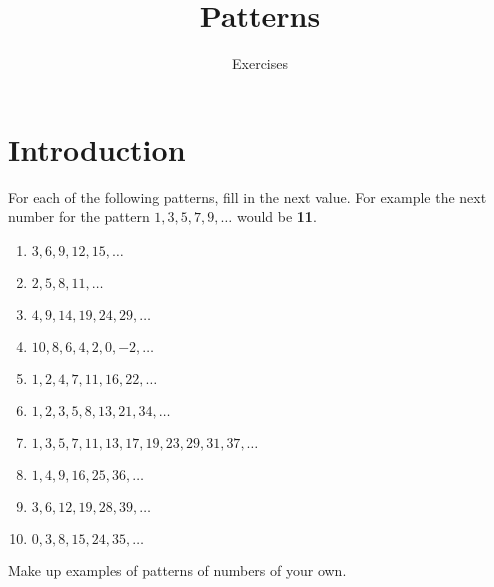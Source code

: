 \documentclass[11pt]{article}
\title{Patterns}
\author{Exercises}
\begin{document}
\maketitle
\section*{Introduction}
For each of the following patterns, fill in the next value.  For example the next number for the pattern
$1, 3, 5, 7, 9, \ldots$
would be \textbf{11}.
\begin{enumerate}
	\item $3, 6, 9, 12, 15, \ldots$
	\item $2, 5, 8, 11, \ldots$
	\item $4, 9, 14, 19, 24, 29, \ldots$
	\item $10, 8, 6, 4, 2, 0, -2, \ldots$
	\item $1, 2, 4, 7, 11, 16, 22, \ldots$
	\item $1, 2, 3, 5, 8, 13, 21, 34, \ldots$
	\item $1, 3, 5, 7, 11, 13, 17, 19, 23, 29, 31, 37,\ldots$
	\item $1, 4, 9, 16, 25, 36, \ldots$
	\item $3, 6, 12, 19, 28, 39, \ldots$
	\item $0, 3, 8, 15, 24, 35, \ldots$
\end{enumerate}

Make up examples of patterns of numbers of your own.
\end{document}
